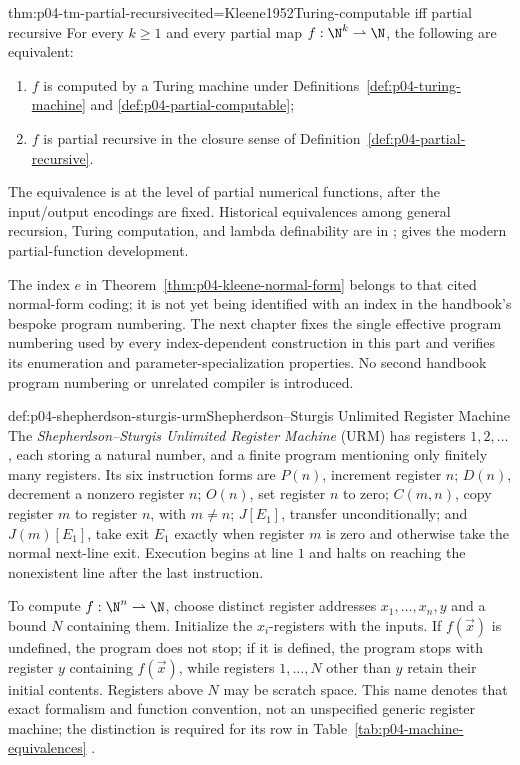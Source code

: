\begin{hbtheorem}{thm:p04-tm-partial-recursive}{cited=Kleene1952}{Turing-computable iff partial recursive}
For every \(k\ge1\) and every partial map
\(f:\N^k\rightharpoonup\N\), the following are equivalent:
\begin{enumerate}
  \item \(f\) is computed by a Turing machine under
        Definitions~\ref{def:p04-turing-machine} and
        \ref{def:p04-partial-computable};
  \item \(f\) is partial recursive in the closure sense of
        Definition~\ref{def:p04-partial-recursive}.
\end{enumerate}
\end{hbtheorem}

The equivalence is at the level of partial numerical functions, after the
input/output encodings are fixed.  Historical equivalences among general recursion,
Turing computation, and lambda definability are in
\cite{Kleene1936,Turing1937Lambda}; \cite{Kleene1952} gives the modern
partial-function development.

The index \(e\) in Theorem~\ref{thm:p04-kleene-normal-form} belongs to that
cited normal-form coding; it is not yet being identified with an index in the
handbook's bespoke program numbering.  The next chapter fixes the single
effective program numbering used by every index-dependent construction in this
part and verifies its enumeration and parameter-specialization properties.  No
second handbook program numbering or unrelated compiler is introduced.

\begin{hbdefinition}{def:p04-shepherdson-sturgis-urm}{Shepherdson--Sturgis Unlimited Register Machine}
The \emph{Shepherdson--Sturgis Unlimited Register Machine} (URM) has registers
\(1,2,\ldots\), each storing a natural number, and a finite program mentioning
only finitely many registers.  Its six instruction forms are
\(P(n)\), increment register \(n\); \(D(n)\), decrement a nonzero register
\(n\); \(O(n)\), set register \(n\) to zero; \(C(m,n)\), copy register \(m\)
to register \(n\), with \(m\ne n\); \(J[E_1]\), transfer unconditionally;
and \(J(m)[E_1]\), take exit \(E_1\) exactly when register \(m\) is zero and
otherwise take the normal next-line exit.  Execution begins at line \(1\) and
halts on reaching the nonexistent line after the last instruction.

To compute \(f:\N^n\rightharpoonup\N\), choose distinct register addresses
\(x_1,\ldots,x_n,y\) and a bound \(N\) containing them.  Initialize the
\(x_i\)-registers with the inputs.  If \(f(\vec x)\) is undefined, the program
does not stop; if it is defined, the program stops with register \(y\)
containing \(f(\vec x)\), while registers \(1,\ldots,N\) other than \(y\)
retain their initial contents.  Registers above \(N\) may be scratch space.
This name denotes that exact formalism and function convention, not an
unspecified generic register machine; the distinction is required for its row in
Table~\ref{tab:p04-machine-equivalences} \cite{ShepherdsonSturgis1963}.
\end{hbdefinition}

